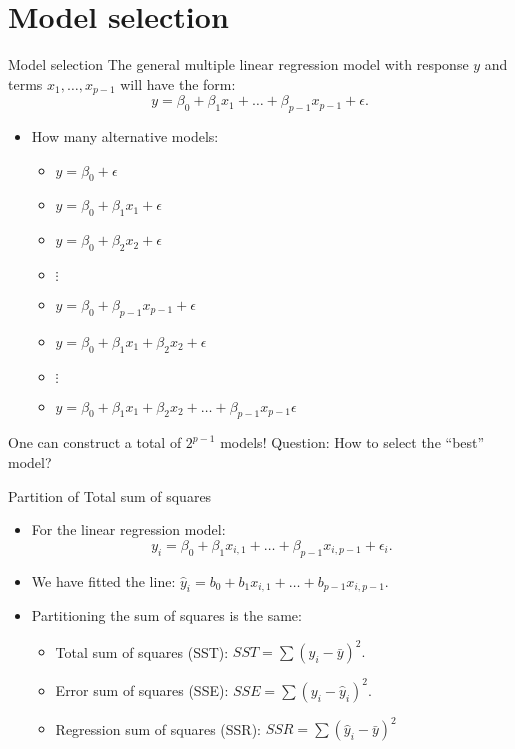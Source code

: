 \documentclass[
  ignorenonframetext,
]{beamer}
\providecommand{\tightlist}{%
  \setlength{\itemsep}{0pt}\setlength{\parskip}{0pt}}
\begin{document}
\hypertarget{model-selection}{%
\section{Model selection}\label{model-selection}}

\begin{frame}{Model selection}
\protect\hypertarget{model-selection-1}{}
The general multiple linear regression model with response \(y\) and
terms \(x_1, \ldots, x_{p-1}\) will have the form:
\[y=\beta_0+\beta_1x_1+\ldots + \beta_{p-1}x_{p-1}+\epsilon.\]

\begin{itemize}
\item
  How many alternative models:

  \begin{itemize}
  \tightlist
  \item
    \(y=\beta_0+\epsilon\)
  \item
    \(y=\beta_0+\beta_1x_1+\epsilon\)
  \item
    \(y=\beta_0+\beta_2x_2+\epsilon\)
  \item
    \(\vdots\)
  \item
    \(y=\beta_0+\beta_{p-1}x_{p-1}+\epsilon\)
  \item
    \(y=\beta_0+\beta_1x_1+\beta_2x_2+\epsilon\)
  \item
    \(\vdots\)
  \item
    \(y=\beta_0+\beta_1x_1+\beta_2x_2+\ldots+\beta_{p-1}x_{p-1}\epsilon\)
  \end{itemize}
\end{itemize}

One can construct a total of \(2^{p-1}\) models! Question: How to select
the ``best'' model?
\end{frame}

\begin{frame}{Partition of Total sum of squares}
\protect\hypertarget{partition-of-total-sum-of-squares-1}{}
\begin{itemize}
\item
  For the linear regression model:
  \[y_i=\beta_0+\beta_1x_{i,1}+\ldots + \beta_{p-1}x_{i,p-1}+\epsilon_i.\]
\item
  We have fitted the line:
  \(\hat{y}_i=b_0+b_1x_{i,1}+\ldots + b_{p-1}x_{i,p-1}.\)
\item
  Partitioning the sum of squares is the same:

  \begin{itemize}
  \item
    Total sum of squares (SST): \(SST=\sum(y_i-\bar{y})^2.\)
  \item
    Error sum of squares (SSE): \(SSE=\sum (y_i-\hat{y}_i)^2.\)
  \item
    Regression sum of squares (SSR): \(SSR=\sum (\hat{y}_i-\bar{y})^2\)
  \end{itemize}
\end{itemize}
\end{frame}
\end{document}
